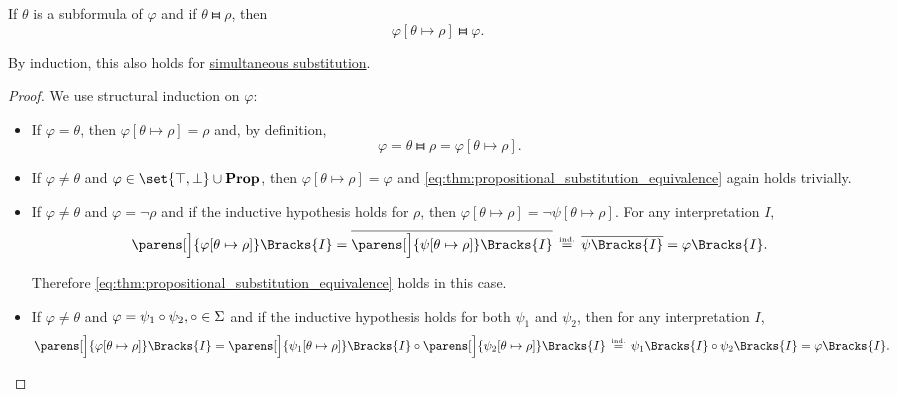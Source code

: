\begin{proposition}\label{thm:propositional_substitution_equivalence}
  If \( \theta \) is a subformula of \( \varphi \) and if \( \theta \gleichstark \rho \), then
  \begin{equation}\label{eq:thm:propositional_substitution_equivalence}
    \varphi[\theta \mapsto \rho] \gleichstark \varphi.
  \end{equation}

  By induction, this also holds for \hyperref[def:propositional_substitution/simultaneous]{simultaneous substitution}.
\end{proposition}
\begin{proof}
  We use structural induction on \( \varphi \):

  \begin{itemize}
    \item If \( \varphi = \theta \), then \( \varphi[\theta \mapsto \rho] = \rho \) and, by definition,
    \begin{equation*}
      \varphi = \theta \gleichstark \rho = \varphi[\theta \mapsto \rho].
    \end{equation*}

    \item If \( \varphi \neq \theta \) and \( \varphi \in \set{ \top, \bot } \cup \boldop{Prop} \), then \( \varphi[\theta \mapsto \rho] = \varphi \) and \eqref{eq:thm:propositional_substitution_equivalence} again holds trivially.

    \item If \( \varphi \neq \theta \) and \( \varphi = \neg \rho \) and if the inductive hypothesis holds for \( \rho \), then \( \varphi[\theta \mapsto \rho] = \neg \psi[\theta \mapsto \rho] \). For any interpretation \( I \),
    \begin{equation*}
      \parens[\Big]{ \varphi[\theta \mapsto \rho] }\Bracks{I}
      =
      \overline{\parens[\Big]{ \psi[\theta \mapsto \rho] }\Bracks{I}}
      \reloset {\T{ind.}} =
      \overline{\psi\Bracks{I}}
      =
      \varphi\Bracks{I}.
    \end{equation*}

    Therefore \eqref{eq:thm:propositional_substitution_equivalence} holds in this case.

    \item If \( \varphi \neq \theta \) and \( \varphi = \psi_1 \mathbin \circ \psi_2, \mathbin \circ \in \Sigma \) and if the inductive hypothesis holds for both \( \psi_1 \) and \( \psi_2 \), then for any interpretation \( I \),
    \begin{equation*}
      \parens[\Big]{ \varphi[\theta \mapsto \rho] }\Bracks{I}
      =
      \parens[\Big]{ \psi_1[\theta \mapsto \rho] }\Bracks{I} \bincirc \parens[\Big]{ \psi_2[\theta \mapsto \rho] }\Bracks{I}
      \reloset {\T{ind.}} =
      \psi_1\Bracks{I} \bincirc \psi_2\Bracks{I}
      =
      \varphi\Bracks{I}.
    \end{equation*}


\end{itemize}
\end{proof}
